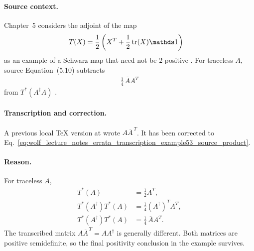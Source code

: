 \documentclass{article}
\begin{document}
\paragraph{Source context.}
Chapter~5 considers the adjoint of the map
\begin{align}
    T(X)
        &=\frac12\left(X^T+\frac12\tr(X)\one\right)
    \label{eq:wolf_lecture_notes_errata_transcription_example53_map}
\end{align}
as an example of a Schwarz map that need not be $2$-positive
\cite[Example~5.3]{Wolf2012Quantum}. For traceless $A$, source
Equation~(5.10) subtracts
\begin{align}
    \frac14\,\overline A A^T
    \label{eq:wolf_lecture_notes_errata_transcription_example53_source_product}
\end{align}
from $T^*(A^\dagger A)$
\cite[Equation~(5.10)]{Wolf2012Quantum}.

\paragraph{Transcription and correction.}
A previous local TeX version at
 wrote
$A\overline A^{\,T}$. It has been corrected to
Eq.~\ref{eq:wolf_lecture_notes_errata_transcription_example53_source_product}.

\paragraph{Reason.}
For traceless $A$,
\begin{align}
    T^*(A)
        &=\frac12A^T,
    \label{eq:wolf_lecture_notes_errata_transcription_example53_adjoint}\\
    T^*(A^\dagger)T^*(A)
        &=\frac14(A^\dagger)^T A^T,
    \label{eq:wolf_lecture_notes_errata_transcription_example53_product_first}\\
    T^*(A^\dagger)T^*(A)
        &=\frac14\,\overline A A^T.
    \label{eq:wolf_lecture_notes_errata_transcription_example53_product_correct}
\end{align}
The transcribed matrix
$A\overline A^{\,T}=AA^\dagger$ is generally different. Both matrices are
positive semidefinite, so the final positivity conclusion in the example
survives.



\end{document}
